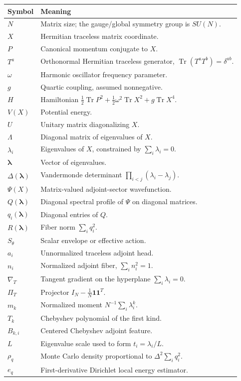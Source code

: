 \documentclass[11pt]{article}
\newcommand{\Tr}{\operatorname{Tr}}
\newcommand{\gradT}{\nabla_{\!T}}
\newcommand{\projT}{\Pi_T}
\begin{document}
\begin{longtable}{p{}p{}}
\toprule
Symbol & Meaning \\
\midrule
\endhead
$N$ & Matrix size; the gauge/global symmetry group is $SU(N)$. \\
$X$ & Hermitian traceless matrix coordinate. \\
$P$ & Canonical momentum conjugate to $X$. \\
$T^a$ & Orthonormal Hermitian traceless generator, $\Tr(T^aT^b)=\delta^{ab}$. \\
$\omega$ & Harmonic oscillator frequency parameter. \\
$g$ & Quartic coupling, assumed nonnegative. \\
$H$ & Hamiltonian $\frac12\Tr P^2+\frac12\omega^2\Tr X^2+g\Tr X^4$. \\
$V(X)$ & Potential energy. \\
$U$ & Unitary matrix diagonalizing $X$. \\
$\Lambda$ & Diagonal matrix of eigenvalues of $X$. \\
$\lambda_i$ & Eigenvalues of $X$, constrained by $\sum_i\lambda_i=0$. \\
$\bm\lambda$ & Vector of eigenvalues. \\
$\Delta(\bm\lambda)$ & Vandermonde determinant $\prod_{i<j}(\lambda_i-\lambda_j)$. \\
$\Psi(X)$ & Matrix-valued adjoint-sector wavefunction. \\
$Q(\bm\lambda)$ & Diagonal spectral profile of $\Psi$ on diagonal matrices. \\
$q_i(\bm\lambda)$ & Diagonal entries of $Q$. \\
$R(\bm\lambda)$ & Fiber norm $\sum_iq_i^2$. \\
$S_\theta$ & Scalar envelope or effective action. \\
$a_i$ & Unnormalized traceless adjoint head. \\
$n_i$ & Normalized adjoint fiber, $\sum_in_i^2=1$. \\
$\gradT$ & Tangent gradient on the hyperplane $\sum_i\lambda_i=0$. \\
$\projT$ & Projector $I_N-\frac1N\bm1\bm1^T$. \\
$m_k$ & Normalized moment $N^{-1}\sum_i\lambda_i^k$. \\
$T_k$ & Chebyshev polynomial of the first kind. \\
$B_{k,i}$ & Centered Chebyshev adjoint feature. \\
$L$ & Eigenvalue scale used to form $t_i=\lambda_i/L$. \\
$\rho_q$ & Monte Carlo density proportional to $\Delta^2\sum_iq_i^2$. \\
$e_q$ & First-derivative Dirichlet local energy estimator. \\
\bottomrule
\end{longtable}
\end{document}

